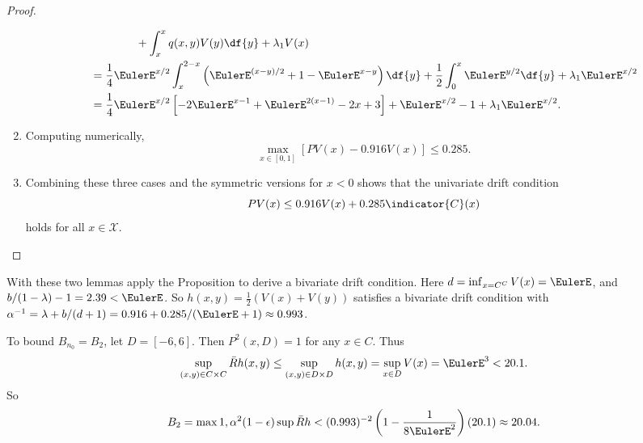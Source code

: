\documentclass[12pt]{article}
\begin{document}
\begin{example}
\begin{proof}
\begin{enumerate}
\begin{align*}
                    &\qquad \qquad + \int_x^x q(x,y) V(y) \df{y} +
                    \lambda_1 V(x) \\
                    &= \frac{1}{4} \EulerE^{x/2} \int_x^{2-x} \left(
                    \EulerE^{(x-y)/2} + 1 - \EulerE^{x-y} \right) \df{y}
                    + \frac{1}{2} \int_0^x \EulerE^{y/2} \df{y} +
                    \lambda_1 \EulerE^{x/2} \\
                    &= \frac{1}{4} \EulerE^{x/2} \left[ -2\EulerE^{x-1}
                    + \EulerE^{2(x-1)} - 2x + 3 \right] + \EulerE^{x/2}
                    - 1 + \lambda_1 \EulerE^{x/2}.
                \end{align*}
            \item
                Computing numerically,
                \[
                    \max_{x \in [0,1]}\left[ PV(x) - 0.916 V(x) \right]
                    \le 0.285.
                \]
            \item
                Combining these three cases and the symmetric versions
                for \( x < 0 \) shows that the univariate drift
                condition
                \[
                    PV(x) \le 0.916 V(x) + 0.285 \indicator{C}(x)
                \] holds for all \( x \in \mathcal{X} \).
        \end{enumerate}
    \end{proof}

    With these two lemmas apply the Proposition to derive a bivariate
    drift condition.  Here \( d = \inf_{x = C^C} V(x) = \EulerE \), and \(
    b/(1-\lambda) - 1 = 2.39 < \EulerE \).  So \( h(x,y) = \frac{1}{2}(V
    (x) + V(y)) \) satisfies a bivariate drift condition with \( \alpha^
    {-1} = \lambda + b/(d + 1) = 0.916 + 0.285/(\EulerE + 1) \approx
    0.993 \).

    To bound \( B_{n_0} = B_2 \), let \( D = [-6, 6] \).  Then \( P^2(x,D)
    = 1 \) for any \( x \in C \).  Thus
    \[
        \sup_{(x,y) \in C \times C} \bar{R} h(x,y) \le \sup_{(x,y) \in D
        \times D}h(x,y) = \sup_{x \in D} V(x) = \EulerE^3 < 20.1.
    \] So
    \[
        B_2 = \max{1, \alpha^2(1-\epsilon) \sup \bar{R} h} < (0.993)^{-2}
        \left(1 - \frac{1}{8 \EulerE^2} \right) (20.1) \approx 20.04.
    \]


\end{example}
\end{document}
